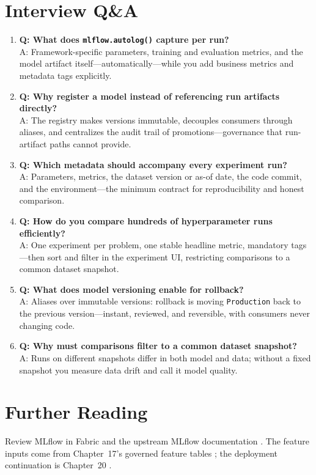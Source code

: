 \section{Interview Q\&A}
\begin{enumerate}
    \item \textbf{Q: What does \texttt{mlflow.autolog()} capture per run?}\\
    A: Framework-specific parameters, training and evaluation metrics, and the model artifact itself---automatically---while you add business metrics and metadata tags explicitly.
    \item \textbf{Q: Why register a model instead of referencing run artifacts directly?}\\
    A: The registry makes versions immutable, decouples consumers through aliases, and centralizes the audit trail of promotions---governance that run-artifact paths cannot provide.
    \item \textbf{Q: Which metadata should accompany every experiment run?}\\
    A: Parameters, metrics, the dataset version or as-of date, the code commit, and the environment---the minimum contract for reproducibility and honest comparison.
    \item \textbf{Q: How do you compare hundreds of hyperparameter runs efficiently?}\\
    A: One experiment per problem, one stable headline metric, mandatory tags---then sort and filter in the experiment UI, restricting comparisons to a common dataset snapshot.
    \item \textbf{Q: What does model versioning enable for rollback?}\\
    A: Aliases over immutable versions: rollback is moving \texttt{Production} back to the previous version---instant, reviewed, and reversible, with consumers never changing code.
    \item \textbf{Q: Why must comparisons filter to a common dataset snapshot?}\\
    A: Runs on different snapshots differ in both model and data; without a fixed snapshot you measure data drift and call it model quality.
\end{enumerate}

\section{Further Reading}
Review MLflow in Fabric \cite{microsoftMlflowFabric} and the upstream MLflow documentation \cite{mlflowDocs}. The feature inputs come from Chapter~17's governed feature tables \cite{microsoftFabricDataScience}; the deployment continuation is Chapter~20 \cite{microsoftFabricMlTraining}.

